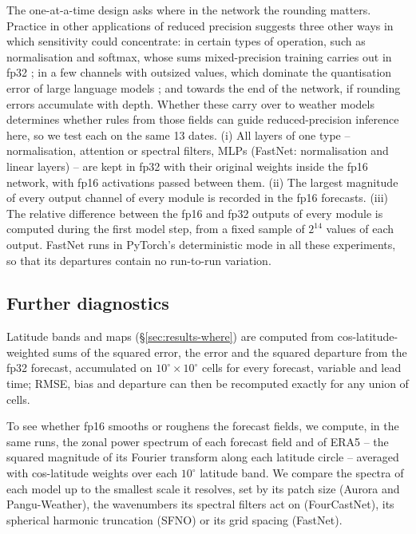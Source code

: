 The one-at-a-time design asks where in the network the rounding
matters. Practice in other applications of reduced precision suggests
three other ways in which sensitivity could concentrate: in certain types
of operation, such as normalisation and softmax, whose sums mixed-precision
training carries out in fp32 \citep{micikevicius2018mixed}; in a few channels
with outsized values, which dominate the quantisation error of large
language models \citep{dettmers2022llmint8}; and towards the end of the
network, if rounding errors accumulate with depth. Whether these carry
over to weather models determines whether rules from those fields can
guide reduced-precision inference here, so we test each on the same 13
dates. (i) All layers of one type -- normalisation, attention or spectral
filters, MLPs (FastNet: normalisation and linear layers) -- are kept in
fp32 with their original weights inside the fp16 network, with fp16
activations passed between them. (ii) The largest magnitude of every
output channel of every module is recorded in the fp16 forecasts. (iii)
The relative difference between the fp16 and fp32 outputs of every module
is computed during the first model step, from a fixed sample of $2^{14}$
values of each output.
FastNet runs in PyTorch's
deterministic mode in all these experiments, so that its departures
contain no run-to-run variation.

\subsection{Further diagnostics}
\label{sec:methods-further}

Latitude bands and maps (\S\ref{sec:results-where})
are computed from cos-latitude-weighted sums of the squared error, the
error and the squared departure from the fp32 forecast, accumulated on
$10^\circ\times10^\circ$ cells for every forecast, variable and lead
time; RMSE, bias and departure can then be recomputed exactly for any
union of cells.

To see whether fp16 smooths or roughens the forecast fields, we
compute, in the same runs, the zonal power spectrum of each forecast
field and of ERA5 -- the squared magnitude of its Fourier transform along
each latitude circle -- averaged with cos-latitude weights over each
$10^\circ$ latitude band. We compare the spectra of each model up to the
smallest scale it resolves, set by its patch size (Aurora and Pangu-Weather),
the wavenumbers its spectral filters act on (FourCastNet), its spherical
harmonic truncation (SFNO) or its grid spacing (FastNet).

